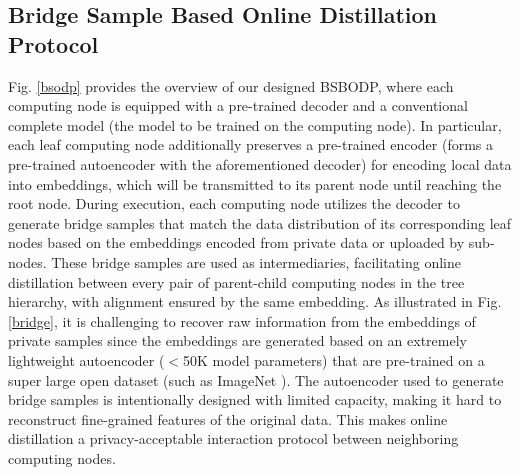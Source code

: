 \documentclass[10pt,journal]{IEEEtran}
\begin{document}


\subsection{Bridge Sample Based Online Distillation Protocol}
Fig. \ref{bsodp} provides the overview of our designed BSBODP, where each computing node is equipped with a pre-trained decoder and a conventional complete model (the model to be trained on the computing node). In particular, each leaf computing node additionally preserves a pre-trained encoder (forms a pre-trained autoencoder with the aforementioned decoder) for encoding local data into embeddings, which will be transmitted to its parent node until reaching the root node.
During execution, each computing node utilizes the decoder to generate bridge samples that match the data distribution of its corresponding leaf nodes based on the embeddings encoded from private data or uploaded by sub-nodes.
These bridge samples are used as intermediaries, facilitating online distillation between every pair of parent-child computing nodes in the tree hierarchy, with alignment ensured by the same embedding. As illustrated in Fig. \ref{bridge}, it is challenging to recover raw information from the embeddings of private samples since the embeddings are generated based on an extremely lightweight autoencoder ($<$50K model parameters) that are pre-trained on a super large open dataset (such as ImageNet \cite{deng2009imagenet}).
The autoencoder used to generate bridge samples is intentionally designed with limited capacity, making it hard to reconstruct fine-grained features of the original data. This makes online distillation a privacy-acceptable interaction protocol between neighboring computing nodes.
\end{document}
